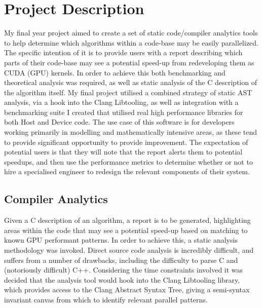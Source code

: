 
\section{Project Description} 
My final year project aimed to create a set of static code/compiler analytics tools to help determine
which algorithms within a code-base may be easily parallelized. The specific intention of it is to provide 
users with a report describing which parts of their code-base may see a potential speed-up from
redeveloping them as CUDA (GPU) \cite{cuda} kernels. In order to achieve this both benchmarking and theoretical
analysis was required, as well as static analysis of the C description of the algorithm itself. My
final project utilised a combined strategy of static AST analysis, via a hook into the Clang
Libtooling, as well as integration with a benchmarking suite I created that utilised real high
performance libraries for both Host and Device code. The use case of this software is for developers
working primarily in modelling and mathematically intensive areas, as these tend to provide
significant opportunity to provide improvement. The expectation of potential users is that they will
note that the report alerts them to potential speedups, and then use the performance metrics to
determine whether or not to hire a specialised engineer to redesign the relevant components of their
system.

\subsection{Compiler Analytics} 
Given a C description of an algorithm, a report is to be generated,
highlighting areas within the code that may see a potential speed-up based on matching to known GPU
performant patterns. In order to achieve this, a static analysis methodology was invoked. Direct
source code analysis is incredibly difficult, and suffers from a number of drawbacks, including the
difficulty to parse C and (notoriously difficult) C++. Considering the time constraints involved it
was decided that the analysis tool would hook into the Clang Libtooling  library, which provides access
to the Clang Abstract Syntax Tree, giving a semi-syntax invariant canvas from which to identify
relevant parallel patterns.

